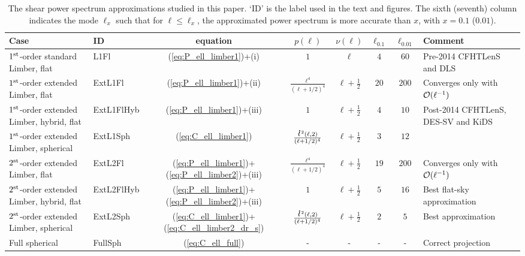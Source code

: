 \documentclass[fleqn,usenatbib]{mnras} %
\newcommand{\ellbar}{\hbox{\it \l}\,}
\begin{document}
\renewcommand{\baselinestretch}{1.5}
\begin{table}
\begin{centering}
  \caption{\label{tab:cases}The shear power spectrum approximations studied in this paper. `ID' is the label
    used in the text and figures.
    The sixth (seventh) column indicates the mode $\ell_x$ such that for $\ell \leq \ell_x$, the approximated
    power spectrum is more accurate than $x$, with $x=0.1$ ($0.01$).
    } 
    \begin{tabular}{|p{}|l|c|c|c|c|c|p{}}
  \hline
  Case & ID & equation & $p(\ell)$ & $\nu(\ell)$ & $\ell_{0.1}$ & $\ell_{0.01}$ & Comment \\ \hline
  $1^{\rm st}$-order standard Limber, flat & L1Fl & (\ref{eq:P_ell_limber1})+(i)
    & $1$ & $\ell$ & $4$ & $60$ & Pre-2014 CFHTLenS and DLS \\ \hline
  $1^{\rm st}$-order extended Limber, flat & ExtL1Fl & (\ref{eq:P_ell_limber1})+(ii)
    & $\frac{\ell^4}{(\ell+1/2)^4}$ & $\ell + \frac 1 2$ & $20$ & $200$ & Converges only with ${\cal O}(\ell^{-1})$ \\ \hline
  $1^{\rm st}$-order extended Limber, hybrid, flat & ExtL1FlHyb & (\ref{eq:P_ell_limber1})+(iii)
    & $1$ & $\ell + \frac 1 2$ & $4$ & $10$ & Post-2014 CFHTLenS, DES-SV and KiDS \\ \hline
  $1^{\rm st}$-order extended Limber, spherical & ExtL1Sph & (\ref{eq:C_ell_limber1})
    & $\frac{\ellbar^2(\ell, 2)}{(\ell+1/2)^4}$ & $\ell+ \frac 1 2$ & $3$ & $12$ & \\ \hline
  $2^{\rm st}$-order extended Limber, flat & ExtL2Fl &  (\ref{eq:P_ell_limber1})+(\ref{eq:P_ell_limber2})+(iii)
    & $\frac{\ell^4}{(\ell+1/2)^4}$ 
    & $\ell+\frac 1 2$ & $19$ & $200$ & Converges only with ${\cal O}(\ell^{-1})$ \\ \hline
  $2^{\rm st}$-order extended Limber, hybrid, flat & ExtL2FlHyb &  (\ref{eq:P_ell_limber1})+(\ref{eq:P_ell_limber2})+(iii)
    & $1$ 
    & $\ell+ \frac 1 2$ & $5$ & $16$ & Best flat-sky approximation \\ \hline
  $2^{\rm st}$-order extended Limber, spherical & ExtL2Sph & (\ref{eq:C_ell_limber1})+(\ref{eq:C_ell_limber2_dr_s})
    & $\frac{\ellbar^2(\ell, 2)}{(\ell+1/2)^4}$ & $\ell+\frac 1 2$ & $2$ & $5$ & Best approximation \\ \hline
  Full spherical & FullSph & (\ref{eq:C_ell_full}) &
      - & - & - & - & Correct projection \\ \hline
  \end{tabular}

\end{centering}
\end{table}
\renewcommand{\baselinestretch}{1}
\end{document}
